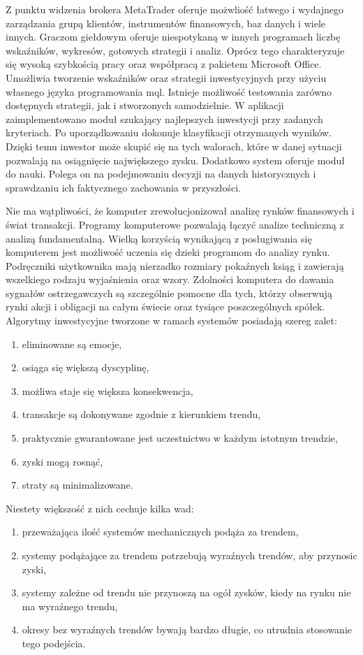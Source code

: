\documentclass[pdflatex,11pt]{aghdpl}
\begin{document}
Z punktu widzenia brokera MetaTrader oferuje możwliość łatwego i wydajnego zarządzania grupą klientów, instrumentów finansowych, baz danych i wiele innych. Graczom giełdowym oferuje niespotykaną w innych programach liczbę wskaźników, wykresów, gotowych strategii i analiz. Oprócz tego charakteryzuje się wysoką szybkością pracy oraz współpracą z pakietem Microsoft Office. Umożliwia tworzenie wskaźników oraz strategii inwestycyjnych przy użyciu własnego języka programowania mql. Istnieje możliwość testowania zarówno dostępnych strategii, jak i stworzonych samodzielnie. W aplikacji zaimplementowano moduł szukający najlepszych inwestycji przy zadanych kryteriach. Po uporządkowaniu dokonuje klasyfikacji otrzymanych wyników. Dzięki temu inwestor może skupić się na tych walorach, które w danej sytuacji pozwalają na osiągnięcie największego zysku. Dodatkowo system oferuje moduł do nauki. Polega on na podejmowaniu decyzji na danych historycznych i sprawdzaniu ich faktycznego zachowania w przyszłości.

Nie ma wątpliwości, że komputer zrewolucjonizował analizę rynków finansowych i świat transakcji. Programy komputerowe pozwalają łączyć analize techniczną z analizą fundamentalną. Wielką korzyścią wynikającą z posługiwania się komputerem jest możliwość uczenia się dzieki programom do analizy rynku. Podręczniki użytkownika mają nierzadko rozmiary pokaźnych ksiąg i zawierają wszelkiego rodzaju wyjaśnienia oraz wzory. Zdolności komputera do dawania sygnałów ostrzegawczych są szczególnie pomocne dla tych, którzy obserwują rynki akcji i obligacji na całym świecie oraz tysiące poszczególnych spółek. Algorytmy inwestycyjne tworzone w ramach systemów posiadają szereg zalet:
\begin{enumerate}
\item eliminowane są emocje,
\item osiąga się większą dyscyplinę,
\item możliwa staje się większa konsekwencja,
\item transakcje są dokonywane zgodnie z kierunkiem trendu,
\item praktycznie gwarantowane jest uczestnictwo w każdym istotnym trendzie,
\item zyski mogą rosnąć,
\item straty są minimalizowane.
\end{enumerate}

Niestety większość z nich cechuje kilka wad:
\begin{enumerate}
\item przeważająca ilość systemów mechanicznych podąża za trendem,
\item systemy podążające za trendem potrzebują wyraźnych trendów, aby przynosic zyski,
\item systemy zależne od trendu nie przynoszą na ogół zysków, kiedy na rynku nie ma wyraźnego trendu,
\item okresy bez wyraźnych trendów bywają bardzo długie, co utrudnia stosowanie tego podejścia.
\end{enumerate}
\end{document}

